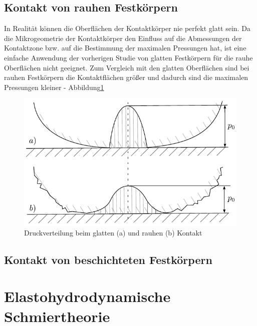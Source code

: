 \subsection{Kontakt von rauhen Festkörpern}
\label{sub:kontakt_von_rauhen_festkoerpern}
In Realität können die Oberflächen der Kontaktkörper nie perfekt glatt sein.
Da die Mikrogeometrie der Kontaktkörper den Einfluss auf die Abmessungen der Kontaktzone bzw. auf die Bestimmung der maximalen Pressungen hat, ist eine einfache Anwendung der vorherigen Studie von glatten Festkörpern für die rauhe Oberflächen nicht geeignet.
Zum Vergleich mit den glatten Oberflächen sind bei rauhen Festkörpern die Kontaktflächen größer und dadurch sind die maximalen Pressungen kleiner - Abbildung\ref{fig:druckverteilung_beim_glatten_und_rauhen_kontakt}
\begin{figure}[htb]
    \centering
    \includegraphics[]{./images/druckverteilung_im_konzentrierten_kontakt.pdf}
    \caption{Druckverteilung beim glatten (a) und rauhen (b) Kontakt\cite{wisniewski}}
    \label{fig:druckverteilung_beim_glatten_und_rauhen_kontakt}
\end{figure}
%

\subsection{Kontakt von beschichteten Festkörpern}
\label{sub:kontakt_von_beschichteten_Festkoerpern}

\section{Elastohydrodynamische Schmiertheorie}
\label{elastohydrodynamische_schmiertheorie}

